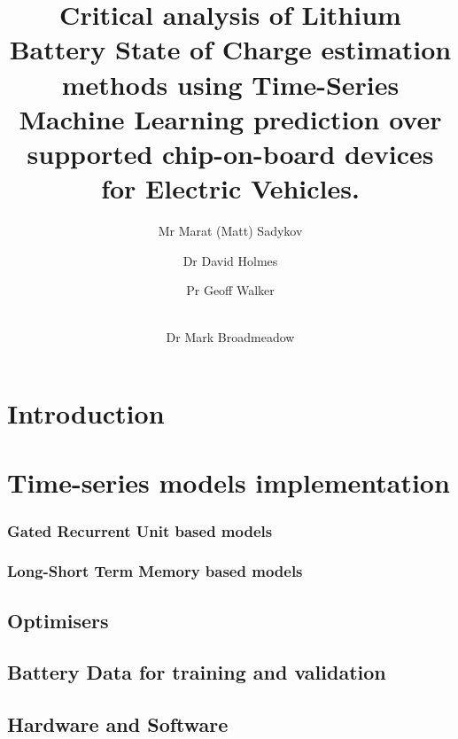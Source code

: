 \documentclass[fleqn,12pt]{olplainarticle}
\title{Critical analysis of Lithium Battery State of Charge estimation methods using Time-Series Machine Learning prediction over supported chip-on-board devices for Electric Vehicles.}
\author[1]{Mr Marat (Matt) Sadykov}
\author[2]{Dr David Holmes}
\author[3]{Pr Geoff Walker}
\author[4]{\\Dr Mark Broadmeadow}
\affil[1]{Queensland University of Technology}
\begin{document}
\flushbottom
\maketitle
\thispagestyle{empty}
\section{Introduction} \label{sec:Introduction}

\section{Time-series models implementation} \label{sec:Body}

\subsubsection{Gated Recurrent Unit based models} \label{subsub:gru}

\subsubsection{Long-Short Term Memory based models} \label{subsub:lstm}

\subsection{Optimisers} \label{subsec:optimisers}

\subsection{Battery Data for training and validation} \label{subsec:b_data}

\subsection{Hardware and Software} \label{subsec:soft}

\end{document}
